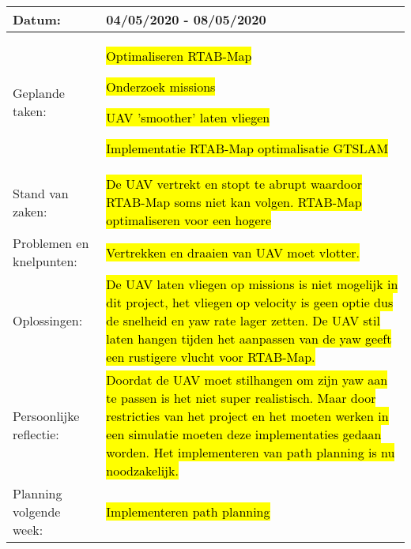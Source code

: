 \begin{tabularx}{\textwidth}{| l | X |}
  \hline
  Datum: & 04/05/2020 - 08/05/2020\\
  \hline
  Geplande taken: &
  \begin{compactitem}
    \item \hl{Optimaliseren RTAB-Map}
    \item \hl{Onderzoek missions}
    \item \hl{UAV 'smoother' laten vliegen}
    \item \hl{Implementatie RTAB-Map optimalisatie GTSLAM}
  \end{compactitem}\\
  \hline
  Stand van zaken: & \hl{De UAV vertrekt en stopt te abrupt waardoor RTAB-Map soms niet kan volgen. RTAB-Map optimaliseren voor een hogere }\\
  \hline
  Problemen en knelpunten: & \hl{Vertrekken en draaien van UAV moet vlotter.}\\
  \hline
  Oplossingen: & \hl{De UAV laten vliegen op missions is niet mogelijk in dit project, het vliegen op velocity is geen optie dus de snelheid en yaw rate lager zetten. De UAV stil laten hangen tijden het aanpassen van de yaw geeft een rustigere vlucht voor RTAB-Map.}\\
  \hline
  Persoonlijke reflectie: & \hl{Doordat de UAV moet stilhangen om zijn yaw aan te passen is het niet super realistisch. Maar door restricties van het project en het moeten werken in een simulatie moeten deze implementaties gedaan worden. Het implementeren van path planning is nu noodzakelijk.}\\
  \hline
  Planning volgende week: &
  \begin{compactitem}
    \item \hl{Implementeren path planning}
  \end{compactitem}\\
  \hline
\end{tabularx}